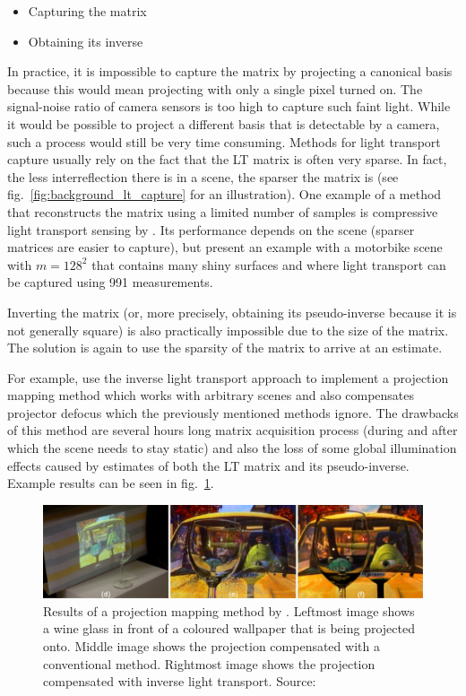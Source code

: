 \begin{itemize}
    \item Capturing the matrix
    \item Obtaining its inverse
\end{itemize}

In practice, it is impossible to capture the matrix by projecting a canonical basis because this would mean projecting with only a single pixel turned on. The signal-noise ratio of camera sensors is too high to capture such faint light. While it would be possible to project a different basis that is detectable by a camera, such a process would still be very time consuming. Methods for light transport capture usually rely on the fact that the LT matrix is often very sparse. In fact, the less interreflection there is in a scene, the sparser the matrix is (see fig.~\ref{fig:background_lt_capture} for an illustration). One example of a method that reconstructs the matrix using a limited number of samples is compressive light transport sensing by \citet{Peers2009}. Its performance depends on the scene (sparser matrices are easier to capture), but \citet{Peers2009} present an example with a motorbike scene with \(m = 128^2\) that contains many shiny surfaces and where light transport can be captured using 991 measurements.

Inverting the matrix (or, more precisely, obtaining its pseudo-inverse because it is not generally square) is also practically impossible due to the size of the matrix. The solution is again to use the sparsity of the matrix to arrive at an estimate.

For example, \citet{Wetzstein2007} use the inverse light transport approach to implement a projection mapping method which works with arbitrary scenes and also compensates projector defocus which the previously mentioned methods ignore. The drawbacks of this method are several hours long matrix acquisition process (during and after which the scene needs to stay static) and also the loss of some global illumination effects caused by estimates of both the LT matrix and its pseudo-inverse. Example results can be seen in fig.~\ref{fig:background_wetzstein_result}.

\begin{figure}
    \centering
    \includegraphics[width=\textwidth]{images/02-wetzstein_result_crop.jpg}
    \caption{Results of a projection mapping method by \citet{Wetzstein2007}. Leftmost image shows a wine glass in front of a coloured wallpaper that is being projected onto. Middle image shows the projection compensated with a conventional method. Rightmost image shows the projection compensated with inverse light transport. Source: \citet{Wetzstein2007}}
    \label{fig:background_wetzstein_result}
\end{figure}

